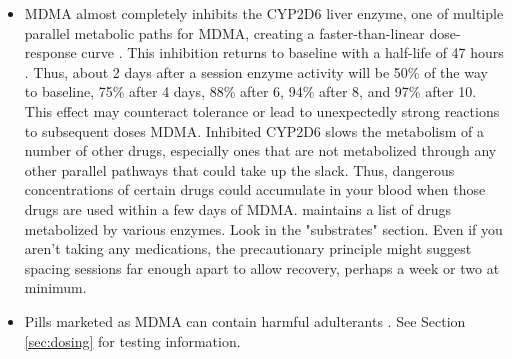 \documentclass[12pt,letterpaper]{book}
\begin{document}
\begin{itemize}
    \item MDMA almost completely inhibits the CYP2D6 liver enzyme, one of multiple parallel metabolic paths for MDMA, creating a faster-than-linear dose-response curve \cite{de2000nonlinear}. This inhibition returns to baseline with a half-life of 47 hours \cite{omathunaCYP}. Thus, about 2 days after a session enzyme activity will be 50\% of the way to baseline, 75\% after 4 days, 88\% after 6, 94\% after 8, and 97\% after 10. This effect may counteract tolerance or lead to unexpectedly strong reactions to subsequent doses MDMA. Inhibited CYP2D6 slows the metabolism of a number of other drugs, especially ones that are not metabolized through any other parallel pathways that could take up the slack. Thus, dangerous concentrations of certain drugs could accumulate in your blood when those drugs are used within a few days of MDMA. \textcite{flockartTable} maintains a list of drugs metabolized by various enzymes. Look in the "substrates" section. Even if you aren't taking any medications, the precautionary principle might suggest spacing sessions far enough apart to allow recovery, perhaps a week or two at minimum.
    \item Pills marketed as MDMA can contain harmful adulterants \cite{saleemiAdulterants}. See Section \ref{sec:dosing} for testing information.
\end{itemize}
\end{document}
